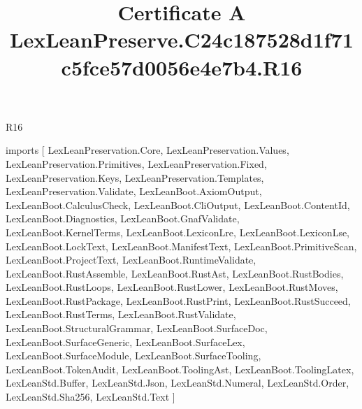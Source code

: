 \begin{lexlean}{R16}
\title{Certificate A LexLeanPreserve.C24c187528d1f71c5fce57d0056e4e7b4.R16}
\begin{coremodule}
imports [
  LexLeanPreservation.Core,
  LexLeanPreservation.Values,
  LexLeanPreservation.Primitives,
  LexLeanPreservation.Fixed,
  LexLeanPreservation.Keys,
  LexLeanPreservation.Templates,
  LexLeanPreservation.Validate,
  LexLeanBoot.AxiomOutput,
  LexLeanBoot.CalculusCheck,
  LexLeanBoot.CliOutput,
  LexLeanBoot.ContentId,
  LexLeanBoot.Diagnostics,
  LexLeanBoot.GnafValidate,
  LexLeanBoot.KernelTerms,
  LexLeanBoot.LexiconLre,
  LexLeanBoot.LexiconLse,
  LexLeanBoot.LockText,
  LexLeanBoot.ManifestText,
  LexLeanBoot.PrimitiveScan,
  LexLeanBoot.ProjectText,
  LexLeanBoot.RuntimeValidate,
  LexLeanBoot.RustAssemble,
  LexLeanBoot.RustAst,
  LexLeanBoot.RustBodies,
  LexLeanBoot.RustLoops,
  LexLeanBoot.RustLower,
  LexLeanBoot.RustMoves,
  LexLeanBoot.RustPackage,
  LexLeanBoot.RustPrint,
  LexLeanBoot.RustSucceed,
  LexLeanBoot.RustTerms,
  LexLeanBoot.RustValidate,
  LexLeanBoot.StructuralGrammar,
  LexLeanBoot.SurfaceDoc,
  LexLeanBoot.SurfaceGeneric,
  LexLeanBoot.SurfaceLex,
  LexLeanBoot.SurfaceModule,
  LexLeanBoot.SurfaceTooling,
  LexLeanBoot.TokenAudit,
  LexLeanBoot.ToolingAst,
  LexLeanBoot.ToolingLatex,
  LexLeanStd.Buffer,
  LexLeanStd.Json,
  LexLeanStd.Numeral,
  LexLeanStd.Order,
  LexLeanStd.Sha256,
  LexLeanStd.Text
]


\end{coremodule}
\end{lexlean}
